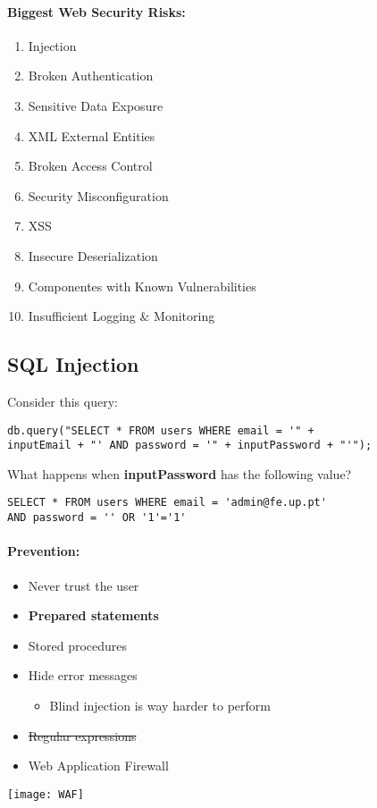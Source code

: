 \documentclass[../ESOF_notes.tex]{subfiles}
\begin{document}
 

\paragraph{Biggest Web Security Risks:}
\begin{enumerate}
    \item Injection
    \item Broken Authentication
    \item Sensitive Data Exposure
    \item XML External Entities
    \item Broken Access Control
    \item Security Misconfiguration
    \item XSS
    \item Insecure Deserialization
    \item Componentes with Known Vulnerabilities
    \item Insufficient Logging \& Monitoring
\end{enumerate}

\subsection{SQL Injection}
Consider this query:
\begin{verbatim}
db.query("SELECT * FROM users WHERE email = '" + 
inputEmail + "' AND password = '" + inputPassword + "'");
\end{verbatim}
What happens when \textbf{inputPassword} has the following value? 

\begin{verbatim}
SELECT * FROM users WHERE email = 'admin@fe.up.pt' 
AND password = '' OR '1'='1'
\end{verbatim}

\paragraph{Prevention:}
\begin{itemize}
    \item Never trust the user
    \item \textbf{Prepared statements}
    \item Stored procedures
    \item Hide error messages
    \begin{itemize}
        \item Blind injection is way harder to perform
    \end{itemize}
    \item \sout{Regular expressions}
    \item Web Application Firewall
\end{itemize}
\begin{center}
\texttt{[image: WAF]}
\end{center}
\end{document}
